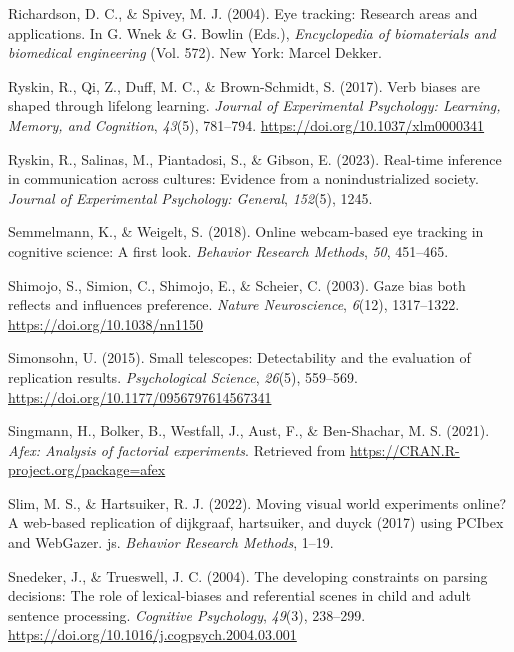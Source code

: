 \documentclass[
  man,floatsintext]{apa6}
\newlength{\cslhangindent}
\newenvironment{CSLReferences}[2] %
 {\begin{list}{}{%
  \setlength{\itemindent}{0pt}
  \setlength{\leftmargin}{0pt}
  \setlength{\parsep}{0pt}
  \ifodd #1
   \setlength{\leftmargin}{\cslhangindent}
   \setlength{\itemindent}{-1\cslhangindent}
  \fi
  \setlength{\itemsep}{#2\baselineskip}}}
 {\end{list}}
\begin{document}
\begin{CSLReferences}{1}{0}
Richardson, D. C., \& Spivey, M. J. (2004). Eye tracking: {Research} areas and applications. In G. Wnek \& G. Bowlin (Eds.), \emph{Encyclopedia of biomaterials and biomedical engineering} (Vol. 572). New York: Marcel Dekker.

Ryskin, R., Qi, Z., Duff, M. C., \& Brown-Schmidt, S. (2017). Verb biases are shaped through lifelong learning. \emph{Journal of Experimental Psychology: Learning, Memory, and Cognition}, \emph{43}(5), 781--794. \url{https://doi.org/10.1037/xlm0000341}

Ryskin, R., Salinas, M., Piantadosi, S., \& Gibson, E. (2023). Real-time inference in communication across cultures: Evidence from a nonindustrialized society. \emph{Journal of Experimental Psychology: General}, \emph{152}(5), 1245.

Semmelmann, K., \& Weigelt, S. (2018). Online webcam-based eye tracking in cognitive science: A first look. \emph{Behavior Research Methods}, \emph{50}, 451--465.

Shimojo, S., Simion, C., Shimojo, E., \& Scheier, C. (2003). Gaze bias both reflects and influences preference. \emph{Nature Neuroscience}, \emph{6}(12), 1317--1322. \url{https://doi.org/10.1038/nn1150}

Simonsohn, U. (2015). Small telescopes: Detectability and the evaluation of replication results. \emph{Psychological Science}, \emph{26}(5), 559--569. \url{https://doi.org/10.1177/0956797614567341}

Singmann, H., Bolker, B., Westfall, J., Aust, F., \& Ben-Shachar, M. S. (2021). \emph{Afex: Analysis of factorial experiments}. Retrieved from \url{https://CRAN.R-project.org/package=afex}

Slim, M. S., \& Hartsuiker, R. J. (2022). Moving visual world experiments online? A web-based replication of dijkgraaf, hartsuiker, and duyck (2017) using PCIbex and WebGazer. js. \emph{Behavior Research Methods}, 1--19.

Snedeker, J., \& Trueswell, J. C. (2004). The developing constraints on parsing decisions: {The} role of lexical-biases and referential scenes in child and adult sentence processing. \emph{Cognitive Psychology}, \emph{49}(3), 238--299. \url{https://doi.org/10.1016/j.cogpsych.2004.03.001}


\end{CSLReferences}
\end{document}
